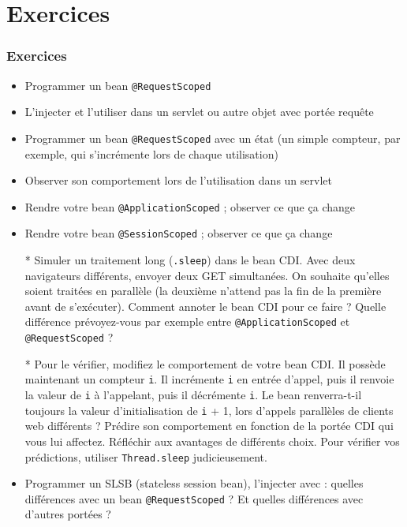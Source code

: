 \documentclass[english, french]{beamer}
\begin{document}
\section{Exercices}
\begin{frame}[allowframebreaks]
	\frametitle{Exercices}
	\begin{itemize}
		\item Programmer un bean \texttt{@RequestScoped}
		\item L’injecter et l’utiliser dans un servlet {\tiny ou autre objet avec portée requête}
		\item Programmer un bean \texttt{@RequestScoped} avec un état (un simple compteur, par exemple, qui s’incrémente lors de chaque utilisation)
		\item Observer son comportement lors de l’utilisation dans un servlet
		\item Rendre votre bean \texttt{@ApplicationScoped} ; observer ce que ça change
		\item Rendre votre bean \texttt{@SessionScoped} ; observer ce que ça change
		\item[*] Simuler un traitement long (\texttt{.sleep}) dans le bean CDI. Avec deux navigateurs différents, envoyer deux GET simultanées. On souhaite qu’elles soient traitées en parallèle (la deuxième n’attend pas la fin de la première avant de s’exécuter). Comment annoter le bean CDI pour ce faire ? Quelle différence prévoyez-vous par exemple entre \texttt{@ApplicationScoped} et \texttt{@RequestScoped} ?
		\item[*] Pour le vérifier, modifiez le comportement de votre bean CDI. Il possède maintenant un compteur \texttt{i}. Il incrémente \texttt{i} en entrée d’appel, puis il renvoie la valeur de \texttt{i} à l’appelant, puis il décrémente \texttt{i}. Le bean renverra-t-il toujours la valeur d’initialisation de \texttt{i} + 1, lors d’appels parallèles de clients web différents ? Prédire son comportement en fonction de la portée CDI qui vous lui affectez. Réfléchir aux avantages de différents choix. Pour vérifier vos prédictions, utiliser \texttt{Thread.sleep} judicieusement.
		\item Programmer un SLSB (stateless session bean), l’injecter avec  : quelles différences avec un bean \texttt{@RequestScoped} ? Et quelles différences avec d’autres portées ?
	\end{itemize}
\end{frame}

\appendix
\AtBeginSection{
}
\end{document}
